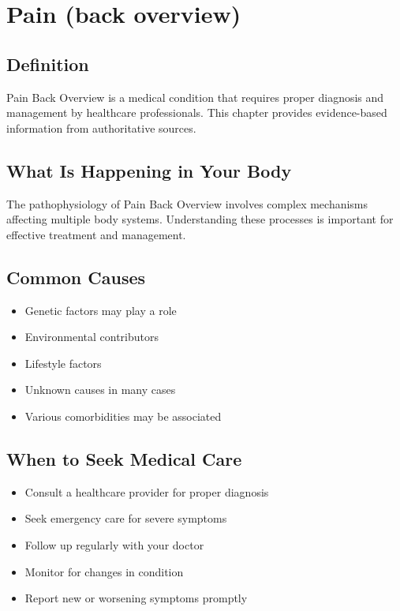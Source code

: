 
\chapter{Pain (back overview)}

\section*{Definition}
Pain Back Overview is a medical condition that requires proper diagnosis and management by healthcare professionals. This chapter provides evidence-based information from authoritative sources.

\section*{What Is Happening in Your Body}
The pathophysiology of Pain Back Overview involves complex mechanisms affecting multiple body systems. Understanding these processes is important for effective treatment and management.

\section*{Common Causes}
\begin{itemize}
  \item Genetic factors may play a role
  \item Environmental contributors
  \item Lifestyle factors
  \item Unknown causes in many cases
  \item Various comorbidities may be associated
\end{itemize}

\section*{When to Seek Medical Care}
\begin{itemize}
  \item Consult a healthcare provider for proper diagnosis
  \item Seek emergency care for severe symptoms
  \item Follow up regularly with your doctor
  \item Monitor for changes in condition
  \item Report new or worsening symptoms promptly
\end{itemize}

